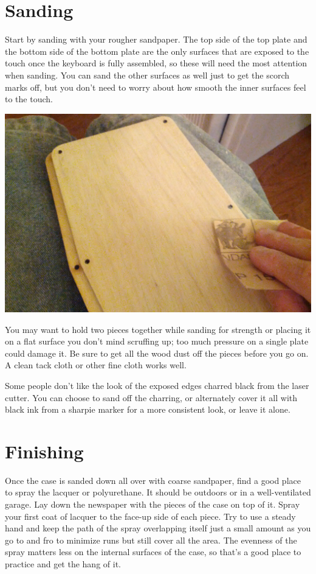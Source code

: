 \documentclass[landscape,twocolumn]{article}
\begin{document}
\section{Sanding}

Start by sanding with your rougher sandpaper. The top side of the
top plate and the bottom side of the bottom plate are the only
surfaces that are exposed to the touch once the keyboard is fully
assembled, so these will need the most attention when sanding. You can
sand the other surfaces as well just to get the scorch marks off, but
you don't need to worry about how smooth the inner surfaces feel to
the touch.

\vspace{1em}
\begin{center}
  \includegraphics[width=0.7\columnwidth]{sanding.jpg}
\end{center}
\vspace{1em}

You may want to hold two pieces together while sanding for strength or
placing it on a flat surface you don't mind scruffing up; too much
pressure on a single plate could damage it. Be sure to get all the
wood dust off the pieces before you go on. A clean tack cloth or other
fine cloth works well.

\vspace{1em}

Some people don't like the look of the exposed edges charred black
from the laser cutter. You can choose to sand off the charring, or
alternately cover it all with black ink from a sharpie marker for a
more consistent look, or leave it alone.

\section{Finishing}

Once the case is sanded down all over with coarse sandpaper, find a
good place to spray the lacquer or polyurethane. It should be outdoors
or in a well-ventilated garage. Lay down the newspaper with the pieces
of the case on top of it. Spray your first coat of lacquer to the
face-up side of each piece. Try to use a steady hand and keep the path
of the spray overlapping itself just a small amount as you go to and
fro to minimize runs but still cover all the area. The evenness of the
spray matters less on the internal surfaces of the case, so that's a
good place to practice and get the hang of it.
\end{document}
